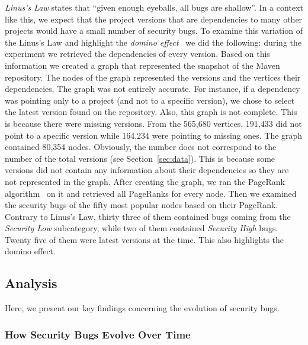 \documentclass[letterpaper,twocolumn,10pt]{article}
\begin{document}
{\it Linus's Law} states that ``given enough eyeballs, all bugs are shallow''.
In a context like this, we expect that
the project versions that are dependencies to many other projects
would have a small number of security
bugs. To examine this variation of the Linus's Law and highlight the
{\it domino effect}~\cite{TH04} we did the
following: during the experiment we retrieved the
dependencies of every version. Based on this information we created a graph
that represented the snapshot of the Maven repository. The
nodes of the graph represented the versions and the vertices their dependencies.
The graph was not entirely accurate. For instance, if
a dependency was pointing only to a project (and not to a specific version), we chose to
select the latest version found on the repository. Also, this graph is not
complete. This is because there were missing versions.
From the 565,680 vertices, 191,433
did not point to a specific version while 164,234 were pointing to missing ones.
The graph contained 80,354 nodes. Obviously, the number does not correspond to
the number of the total versions (see Section~\ref{sec:data}). This is because
some versions did not contain any information about their dependencies so they
are not represented in the graph. After creating the graph, we ran the PageRank
algorithm~\cite{BP98} on it and retrieved all PageRanks for every node. Then we
examined the security bugs of the fifty most popular nodes based on their PageRank.
Contrary to Linus's Law, thirty three of them contained bugs coming from the
{\it Security Low} subcategory, while two of them contained {\it
  Security High} bugs.
Twenty five of them were latest versions at the time. This also highlights
the domino effect.

\subsection{Analysis}
\label{sec:analysis}

Here, we present our key findings concerning the evolution of security bugs.

\subsubsection{How Security Bugs Evolve Over Time}
\end{document}
